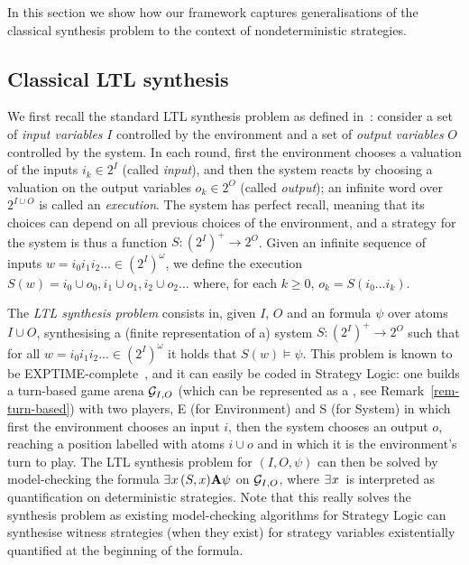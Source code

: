 In this section we show how our framework captures generalisations of
the classical \LTL synthesis problem to the context of nondeterministic strategies.

\subsection{Classical LTL synthesis}
\label{sec-ltl-synth}

We first recall the standard LTL synthesis problem as defined
in~\cite{pnueli1989synthesisshort}: consider a set of \emph{input
  variables} $I$ controlled by the environment and a set of
\emph{output variables} $O$ controlled by the system. In each round,
first the environment chooses a valuation of the inputs $i_k\in 2^I$
(called \emph{input}), and then the system reacts by choosing a
valuation on the output variables $o_k\in 2^O$ (called \emph{output});
an infinite word over $2^{I\cup O}$ is called an
\emph{execution}. The system has perfect recall, meaning that its
choices can depend on all previous choices of the environment, and a
strategy for the system is thus a function $S:(2^I)^+\to 2^O$. Given
an infinite sequence of inputs $w=i_0i_1i_2\ldots \in (2^I)^\omega$, we
define the execution $S(w)=i_0\cup o_0, i_1\cup o_1, i_2\cup o_2\ldots$ where,
for each $k\geq 0$, $o_k=S(i_0\ldots i_k)$.

The \emph{LTL synthesis problem} consists in,
given $I$, $O$ and an \LTL formula $\psi$ over atoms $I\cup O$,
synthesising a (finite representation of a) system $S:(2^I)^+\to 2^O$ such
that for all $w=i_0i_1i_2\ldots\in (2^I)^\omega$ it holds that $S(w)\models\psi$.
This problem is known to be
\2EXPTIME-complete~\cite{pnueli1989synthesisshort}, and it can easily
be coded in Strategy Logic: one builds a turn-based game arena $\CGS_{I,O}$ (which
can be represented as a \CGS, see Remark~\ref{rem-turn-based}) with
two players, E (for Environment) and S (for System) in
which first the environment chooses an input $i$, then the system chooses
an output $o$, reaching a position labelled with atoms $i\cup o$ and in which it is
the environment's turn to play. The LTL synthesis problem for $(I,O,\psi)$ can
then be solved by model-checking the \SL formula $\exists^{} x\, (S,x) {\bf A}
\psi$ on $\CGS_{I,O}$, where $\exists^{} x\,$ is interpreted as
quantification on deterministic strategies. Note that this really solves the synthesis
problem as existing model-checking algorithms for Strategy Logic can
synthesise  witness strategies (when they exist) for strategy variables existentially
quantified at the beginning of the formula.

